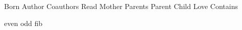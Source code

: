 
\DefRel Born
\DefRel Author
\DefRel Coauthors
\DefRel Read
\DefRel Mother
\DefRel Parents
\DefRel Parent
\DefRel Child
\DefRel Love
\DefRel Contains

\DefFun even
\DefFun odd
\DefFun fib

\def\Smile{\rel{\ddot\smile}}
\def\Frown{\rel{\ddot\frown}}

\def\oddAs#1{A_{[#1]}}


